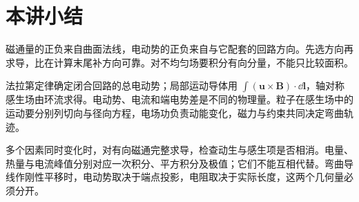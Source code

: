 \section{本讲小结}
磁通量的正负来自曲面法线，电动势的正负来自与它配套的回路方向。先选方向再求导，比在计算末尾补方向可靠。对不均匀场要积分有向分量，不能只比较面积。

法拉第定律确定闭合回路的总电动势；局部运动导体用 $\int(\bm u\times\bm B)\cdot\dd\bm l$，轴对称感生场由环流求得。电动势、电流和端电势差是不同的物理量。粒子在感生场中的运动要分别列切向与径向方程，电场功负责动能变化，磁力与约束共同决定弯曲轨迹。

多个因素同时变化时，对有向磁通完整求导，检查动生与感生项是否相消。电量、热量与电流峰值分别对应一次积分、平方积分及极值；它们不能互相代替。弯曲导线作刚性平移时，电动势取决于端点投影，电阻取决于实际长度，这两个几何量必须分开。


